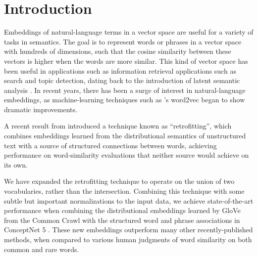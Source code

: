 \documentclass[letterpaper]{article}
\title{\thetitle}
\begin{document}
\maketitle
\begin{abstract}
Embeddings of natural-language words in a vector space are useful for a variety
of tasks in semantics, and these embeddings are often evaluated on their ability
to rank similar words. In this paper, we show the effectiveness of combining
existing embeddings learned by GloVe with structured knowledge from the semantic
network ConceptNet 5, taking care to merge them into a common word
representation. The resulting vector space has a larger vocabulary than either
source, works on non-English words and multiple-word phrases, and achieves
state-of-the-art performance on word similarity evaluations, including an
unprecedented score of $\rho = \scoreRW{}$ on the Stanford rare-words
evaluation.
\end{abstract}

\section{Introduction}
Embeddings of natural-language terms in a vector space are useful for a variety
of tasks in semantics. The goal is to represent words or phrases in a vector
space with hundreds of dimensions, such that the cosine similarity between
these vectors is higher when the words are more similar. This kind of vector
space has been useful in applications such as information retrieval
applications such as search and topic detection, dating back to the
introduction of latent semantic analysis \cite{deerwester1990lsa}. In recent
years, there has been a surge of interest in natural-language embeddings, as
machine-learning techniques such as 's word2vec
began to show dramatic improvements.

A recent result from  introduced a technique
known as ``retrofitting'', which combines embeddings learned from the
distributional semantics of unstructured text with a source of structured
connections between words, achieving performance on word-similarity evaluations
that neither source would achieve on its own.

We have expanded the retrofitting technique to operate on the union of two
vocabularies, rather than the intersection. Combining this technique with some
subtle but important normalizations to the input data, we achieve state-of-the-art
performance when combining the distributional
embeddings learned by GloVe \cite{pennington2014glove} from the Common Crawl
\cite{TODOcrawl} with the structured word and phrase associations in ConceptNet
5 \cite{speer2012conceptnet}. These new embeddings outperform many other
recently-published methods, when compared to various human judgments of word
similarity on both common and rare words.
\end{document}
